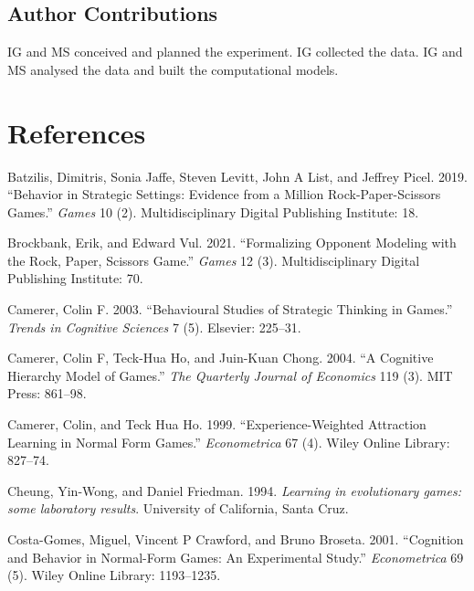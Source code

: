\documentclass[smallextended]{svjour3}       %
\begin{document}
\hypertarget{author-contributions}{%
\subsection{Author Contributions}\label{author-contributions}}

IG and MS conceived and planned the experiment. IG collected the data.
IG and MS analysed the data and built the computational models.

\hypertarget{references}{%
\section*{References}\label{references}}

\hypertarget{refs}{}
\leavevmode\hypertarget{ref-batzilis2019behavior}{}%
Batzilis, Dimitris, Sonia Jaffe, Steven Levitt, John A List, and Jeffrey
Picel. 2019. ``Behavior in Strategic Settings: Evidence from a Million
Rock-Paper-Scissors Games.'' \emph{Games} 10 (2). Multidisciplinary
Digital Publishing Institute: 18.

\leavevmode\hypertarget{ref-brockbank2021formalizing}{}%
Brockbank, Erik, and Edward Vul. 2021. ``Formalizing Opponent Modeling
with the Rock, Paper, Scissors Game.'' \emph{Games} 12 (3).
Multidisciplinary Digital Publishing Institute: 70.

\leavevmode\hypertarget{ref-camerer2003behavioural}{}%
Camerer, Colin F. 2003. ``Behavioural Studies of Strategic Thinking in
Games.'' \emph{Trends in Cognitive Sciences} 7 (5). Elsevier: 225--31.

\leavevmode\hypertarget{ref-camerer2004cognitive}{}%
Camerer, Colin F, Teck-Hua Ho, and Juin-Kuan Chong. 2004. ``A Cognitive
Hierarchy Model of Games.'' \emph{The Quarterly Journal of Economics}
119 (3). MIT Press: 861--98.

\leavevmode\hypertarget{ref-camerer1999experience}{}%
Camerer, Colin, and Teck Hua Ho. 1999. ``Experience-Weighted Attraction
Learning in Normal Form Games.'' \emph{Econometrica} 67 (4). Wiley
Online Library: 827--74.

\leavevmode\hypertarget{ref-cheung1994learning}{}%
Cheung, Yin-Wong, and Daniel Friedman. 1994. \emph{Learning in
evolutionary games: some laboratory results}. University of California,
Santa Cruz.

\leavevmode\hypertarget{ref-costa2001cognition}{}%
Costa-Gomes, Miguel, Vincent P Crawford, and Bruno Broseta. 2001.
``Cognition and Behavior in Normal-Form Games: An Experimental Study.''
\emph{Econometrica} 69 (5). Wiley Online Library: 1193--1235.
\end{document}
